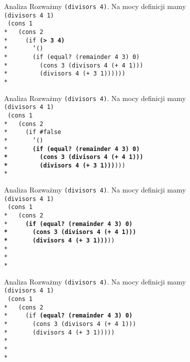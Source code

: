 \begin{frame}{Analiza}
  Rozważmy \texttt{(divisors 4)}. Na mocy definicji mamy\\
  \texttt{(divisors 4 1)}\\
  \texttt{
(cons 1 \\*
\ \ (cons 2 \\*
\ \ \ \ (if \textbf{(> 3 4)}\\*
\ \ \ \ \ \ '()\\*
\ \ \ \ \ \ (if (equal?\ (remainder 4 3) 0)\\*
\ \ \ \ \ \ \ \ (cons 3 (divisors 4 (+ 4 1)))\\*
\ \ \ \ \ \ \ \ (divisors 4 (+ 3 1))))))\\*
  }
\end{frame}


\begin{frame}{Analiza}
  Rozważmy \texttt{(divisors 4)}. Na mocy definicji mamy\\
  \texttt{(divisors 4 1)}\\
  \texttt{
(cons 1 \\*
\ \ (cons 2 \\*
\ \ \ \ (if \#false\\*
\ \ \ \ \ \ '()\\*
\ \ \ \ \ \ \textbf{(if (equal?\ (remainder 4 3) 0)\\*
\ \ \ \ \ \ \ \ (cons 3 (divisors 4 (+ 4 1)))\\*
\ \ \ \ \ \ \ \ (divisors 4 (+ 3 1)))})))\\*
  }
\end{frame}


\begin{frame}{Analiza}
  Rozważmy \texttt{(divisors 4)}. Na mocy definicji mamy\\
  \texttt{(divisors 4 1)}\\
  \texttt{
(cons 1 \\*
\ \ (cons 2 \\*
\ \ \ \ \textbf{(if (equal?\ (remainder 4 3) 0)\\*
\ \ \ \ \ \ (cons 3 (divisors 4 (+ 4 1)))\\*
\ \ \ \ \ \ (divisors 4 (+ 3 1)))}))\\*
\ \\*
\ \\*
  }
\end{frame}

\begin{frame}{Analiza}
  Rozważmy \texttt{(divisors 4)}. Na mocy definicji mamy\\
  \texttt{(divisors 4 1)}\\
  \texttt{
(cons 1 \\*
\ \ (cons 2 \\*
\ \ \ \ (if \textbf{(equal?\ (remainder 4 3) 0)}\\*
\ \ \ \ \ \ (cons 3 (divisors 4 (+ 4 1)))\\*
\ \ \ \ \ \ (divisors 4 (+ 3 1)))))\\*
\ \\*
\ \\*
  }
\end{frame}

